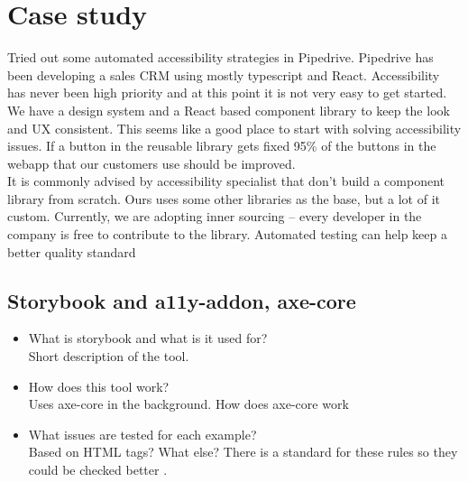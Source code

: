 \section{Case study}

Tried out some automated accessibility strategies in Pipedrive. Pipedrive has been developing a sales CRM using mostly typescript and React. Accessibility has never been high priority and at this point it is not very easy to get started. We have a design system and a React based component library to keep the look and UX consistent. This seems like a good place to start with solving accessibility issues. If a button in the reusable library gets fixed 95\% of the buttons in the webapp that our customers use should be improved. \\
It is commonly advised by accessibility specialist that don't build a component library from scratch.
Ours uses some other libraries as the base, but a lot of it custom. Currently, we are adopting inner sourcing – every developer in the company is free to contribute to the library.
Automated testing can help keep a better quality standard

\subsection{Storybook and a11y-addon, axe-core}

\begin{itemize}
	\item What is storybook and what is it used for?\\
	Short description of the tool.
	\item How does this tool work?\\
	Uses axe-core in the background. How does axe-core work
	\item What issues are tested for each example? \\
	Based on HTML tags? What else? There is a standard for these rules so they could be checked better \citep{InitiativeWAI}.
\end{itemize}

